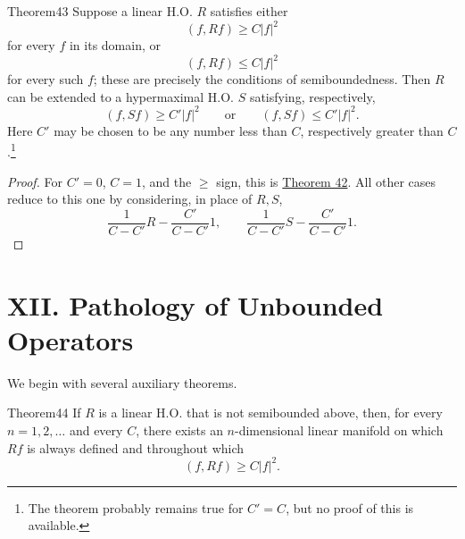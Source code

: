 ﻿\documentclass[paper=b5,fontsize=13pt,bookmarkpackage=false,twoside]{scrartcl}
\begin{document}
\begin{namedstatement}{Theorem}{43}\label{thm:43}
Suppose a linear H.O. $R$ satisfies either
\[
(f,Rf)\ge C|f|^2
\]
for every $f$ in its domain, or
\[
(f,Rf)\le C|f|^2
\]
for every such $f$; these are precisely the conditions of semiboundedness. Then $R$ can be extended to a hypermaximal H.O. $S$ satisfying, respectively,
\[
(f,Sf)\ge C'|f|^2
\qquad\text{or}\qquad
(f,Sf)\le C'|f|^2.
\]
Here $C'$ may be chosen to be any number less than $C$, respectively greater than $C$.\footnote{\label{fn:58}The theorem probably remains true for $C'=C$, but no proof of this is available.}
\end{namedstatement}

\begin{proof}
For $C'=0$, $C=1$, and the $\ge$ sign, this is \hyperref[thm:42]{Theorem 42}. All other cases reduce to this one by considering, in place of $R,S$,
\[
\frac{1}{C-C'}R-\frac{C'}{C-C'}1,
\qquad
\frac{1}{C-C'}S-\frac{C'}{C-C'}1.
\]
\end{proof}

\section*{XII. Pathology of Unbounded Operators}\label{chap:XII}

We begin with several auxiliary theorems.

\begin{namedstatement}{Theorem}{44}\label{thm:44}
If $R$ is a linear H.O. that is not semibounded above, then, for every $n=1,2,\ldots$ and every $C$, there exists an $n$-dimensional linear manifold on which $Rf$ is always defined and throughout which
\[
(f,Rf)\ge C|f|^2.
\]
\end{namedstatement}
\end{document}
